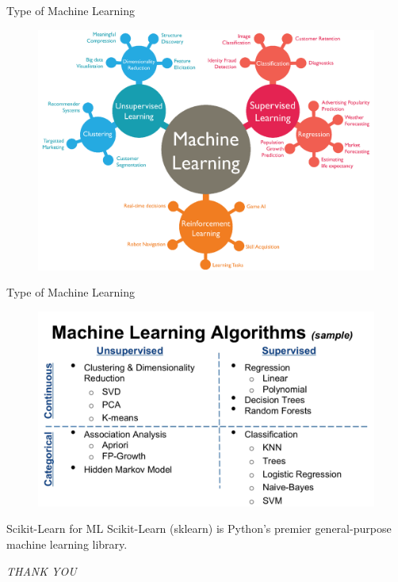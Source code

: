 \documentclass{bredelebeamer}
\begin{document}
\begin{frame}{Type of Machine Learning}
\begin{figure}[h]
\includegraphics[scale=0.75]{../image/ml_type4.png}
\end{figure}
\end{frame}

\begin{frame}{Type of Machine Learning}
\begin{figure}[h]
\includegraphics[scale=0.55]{../image/ml_type3.png}
\end{figure}
\end{frame}

\begin{frame}{Scikit-Learn for ML}
Scikit-Learn (sklearn) is Python's premier general-purpose machine learning library. 
\end{frame}
\begin{frame}
\centering
\emph{THANK YOU}
\end{frame}
\end{document}
